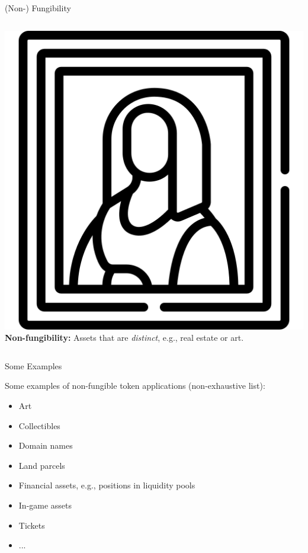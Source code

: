 \documentclass[handout]{beamer}
\begin{document}
\begin{frame}{(Non-) Fungibility}
{\begin{columns}
		\includegraphics[scale=0.08]{../assets/images/mona-lisa.png}
		\textbf{Non-fungibility:} Assets that are \textit{distinct}, e.g., real estate or art.
\end{columns}
}
\end{frame}

\begin{frame}{Some Examples}

Some examples of non-fungible token applications (non-exhaustive list):

\begin{itemize}
	\item<2-> Art
	\item<3-> Collectibles
	\item<4-> Domain names
	\item<5-> Land parcels
	\item<6-> Financial assets, e.g., positions in liquidity pools
	\item<7-> In-game assets
	\item<8-> Tickets
	\item<8-> ...
\end{itemize}

\end{frame}
\end{document}
